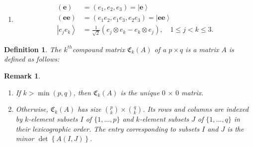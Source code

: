 \documentclass[aps,preprint]{revtex4}%
\newtheorem{definition}[theorem]{Definition}
\newtheorem{example}[theorem]{Example}
\newtheorem{remark}[theorem]{Remark}
\begin{document}
\begin{enumerate}
\begin{example}
\begin{enumerate}
\end{enumerate}
\end{example}

\item
\begin{align}
\left(  \mathbf{e}\right)   &  =\left(  e_{1},e_{2},e_{3}\right)  =\left\vert
\mathbf{e}\right\rangle \\
\left(  \mathbf{ee}\right)   &  =\left(  e_{1}e_{2},e_{1}e_{3},e_{2}%
e_{3}\right)  =\left\vert \mathbf{ee}\right\rangle \\
\left\vert e_{j}e_{k}\right\rangle  &  =\frac{1}{\sqrt{2}}\left(  e_{j}\otimes
e_{k}-e_{k}\otimes e_{j}\right)  ,\quad1\leq j<k\leq3.
\end{align}

\end{enumerate}

\begin{definition}
\label{k-th compound matrix}The $k^{th}${\large \thinspace compound matrix}
$\mathfrak{C}_{k}\left(  A\right)  $ of a $p\times q$ is a matrix $A$ is
defined as follows:
\end{definition}

\begin{remark}
\begin{enumerate}
\item If $k>\min(p,q)$, then $\mathfrak{C}_{k}\left(  A\right)  $ is the
unique $0\,\times\,0$ matrix.

\item Otherwise, $\mathfrak{C}_{k}\left(  A\right)  $ has size $\binom{p}%
{k}\times\binom{q}{k}$. Its rows and columns are indexed by $k$-element
subsets $I$ of $\{1,...,p\}$ and $k$-element subsets $J$ of $\{1,...,q\}$ in
their lexicographic order. The entry corresponding to subsets $I$ and $J$ is
the \emph{minor} $\det\left\{  A\left(  I,J\right)  \right\}  $.
\end{enumerate}
\end{remark}
\end{document}
